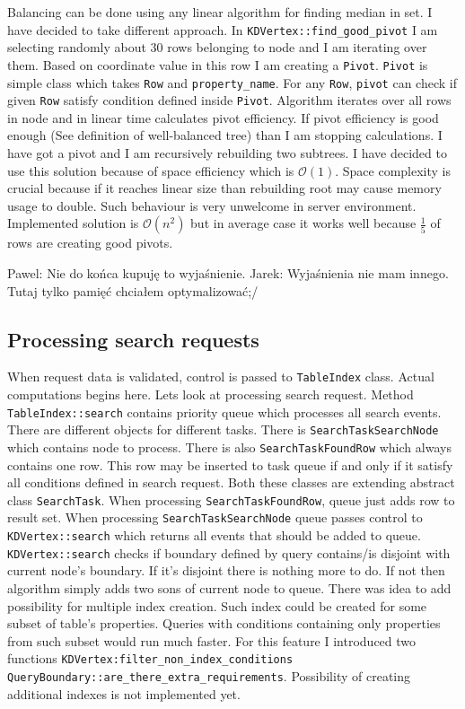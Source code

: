 \documentclass[10pt,a4paper]{article}
\newcommand{\pawel}[1]{\noindent\colorbox{myRed}{Pawel: #1}}
\newcommand{\jarek}[1]{\noindent\colorbox{myYellow}{Jarek: #1}}
\newcommand{\Oh}{\mathcal{O}}
\begin{document}
Balancing can be done using any linear algorithm for finding median in set. I have decided to take different approach. In \verb|KDVertex::find_good_pivot| I am selecting randomly about 30 rows belonging to node and I am iterating over them. Based on coordinate value in this row I am creating a \verb|Pivot|. \verb|Pivot| is simple class which takes \verb|Row| and \verb|property_name|. For any \verb|Row|, \verb|pivot| can check if given \verb|Row| satisfy condition defined inside \verb|Pivot|. Algorithm iterates over all rows in node and in linear time calculates pivot efficiency. If pivot efficiency is good enough (See definition of well-balanced tree) than I am stopping calculations. I have got a pivot and I am recursively rebuilding two subtrees. I have decided to use this solution because of space efficiency which is $\Oh(1)$. Space complexity is crucial because if it reaches linear size than rebuilding root may cause memory usage to double. Such behaviour is very unwelcome in server environment. Implemented solution is $\Oh(n^2)$ but in average case it works well because $\frac{1}{5}$ of rows are creating good pivots.

\pawel{Nie do końca kupuję to wyjaśnienie.}
\jarek{Wyjaśnienia nie mam innego. Tutaj tylko pamięć chciałem optymalizować;/}

\subsection{Processing search requests}

When request data is validated, control is passed to \verb|TableIndex| class. Actual computations begins here. Lets look at processing search request. Method \verb|TableIndex::search| contains priority queue which processes all search events. There are different objects for different tasks. There is \verb|SearchTaskSearchNode| which contains node to process. There is also \verb|SearchTaskFoundRow| which always contains one row. This row may be inserted to task queue if and only if it satisfy all conditions defined in search request. Both these classes are extending abstract class \verb|SearchTask|. When processing \verb|SearchTaskFoundRow|, queue just adds row to result set. When processing \verb|SearchTaskSearchNode| queue passes control to \verb|KDVertex::search| which returns all events that should be added to queue. \verb|KDVertex::search| checks if boundary defined by query contains/is disjoint with current node's boundary. If it's disjoint there is nothing more to do. If not then algorithm simply adds two sons of current node to queue. There was idea to add possibility for multiple index creation. Such index could be created for some subset of table's properties. Queries with conditions containing only properties from such subset would run much faster. For this feature I introduced two functions \verb|KDVertex:filter_non_index_conditions| \verb|QueryBoundary::are_there_extra_requirements|. Possibility of creating additional indexes is not implemented yet.  
\end{document}
